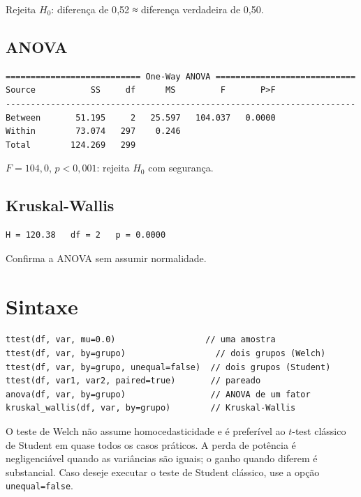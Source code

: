 Rejeita $H_0$: diferença de 0{,}52 ≈ diferença verdadeira de 0{,}50.

\subsection*{ANOVA}

\begin{lstlisting}[language={}, basicstyle=\ttfamily\small, frame=none,
  numbers=none, backgroundcolor=\color{codbg}]
=========================== One-Way ANOVA ============================
Source           SS     df      MS         F       P>F
----------------------------------------------------------------------
Between       51.195     2   25.597   104.037   0.0000
Within        73.074   297    0.246
Total        124.269   299
\end{lstlisting}

$F = 104{,}0$, $p < 0{,}001$: rejeita $H_0$ com segurança.

\subsection*{Kruskal-Wallis}

\begin{lstlisting}[language={}, basicstyle=\ttfamily\small, frame=none,
  numbers=none, backgroundcolor=\color{codbg}]
H = 120.38   df = 2   p = 0.0000
\end{lstlisting}

Confirma a ANOVA sem assumir normalidade.

\section{Sintaxe}

\begin{lstlisting}
ttest(df, var, mu=0.0)                  // uma amostra
ttest(df, var, by=grupo)                  // dois grupos (Welch)
ttest(df, var, by=grupo, unequal=false)  // dois grupos (Student)
ttest(df, var1, var2, paired=true)       // pareado
anova(df, var, by=grupo)                 // ANOVA de um fator
kruskal_wallis(df, var, by=grupo)        // Kruskal-Wallis
\end{lstlisting}

\begin{nota}
  O teste de Welch não assume homocedasticidade e é preferível ao $t$-test
  clássico de Student em quase todos os casos práticos. A perda de potência
  é negligenciável quando as variâncias são iguais; o ganho quando diferem
  é substancial. Caso deseje executar o teste de Student clássico, use a
  opção \texttt{unequal=false}.
\end{nota}
